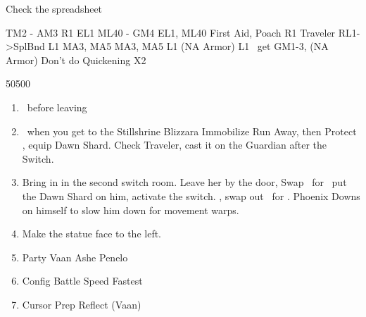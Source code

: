 \begin{liscense}
	Check the spreadsheet

	TM2 - AM3
	R1	EL1
	ML40 - GM4
	EL1, ML40
	First Aid, Poach					R1
	Traveler
	RL1->SplBnd
	L1					MA3, MA5
	MA3, MA5	L1
	(NA Armor)	L1
	\balthier\ get GM1-3, (NA Armor)
	Don't do Quickening X2
\end{liscense}
\begin{shop}{50500}
\end{shop}
\begin{enumerate}
	\item \save\ before leaving
	\item \save\ when you get to the Stillshrine
	      \ashef Blizzara \penelo
	      \penelof Immobilize \penelo
	      \vaanf Run Away, then Protect \vaan, equip Dawn Shard. Check Traveler, cast it on the Guardian after the Switch.
	\item Bring in \penelo in the second switch room. Leave her by the door, Swap \vaan\ for \balthier\, put the Dawn Shard on him, activate the switch. \leader{\penelo}, swap out \penelo\ for \vaan.
	      \balthierf Phoenix Downs on himself to slow him down for movement warps.
	\item Make the statue face to the left.
	\item Party	Vaan	Ashe	Penelo
	\item Config	Battle Speed	Fastest
	\item Cursor	Prep Reflect (Vaan)
\end{enumerate}

